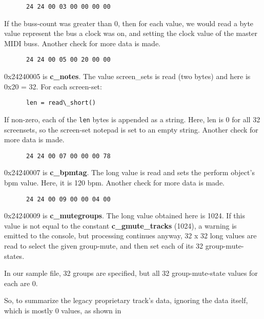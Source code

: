    \begin{verbatim}
      24 24 00 03 00 00 00 00
   \end{verbatim}

   If the buss-count was greater than 0, then for each value, we would read a
   byte value represent the bus a clock was on, and setting the clock value
   of the master MIDI buss.
   Another check for more data is made.

   \begin{verbatim}
      24 24 00 05 00 20 00 00
   \end{verbatim}

   0x24240005 is \textbf{c\_notes}.  The value screen\_sets is read (two
   bytes) and
   here is 0x20 = 32.  For each screen-set:

   \begin{verbatim}
      len = read\_short()
   \end{verbatim}

   If non-zero, each of the \texttt{len} bytes is appended as a string.
   Here, len is 0 for all 32 screensets, so the screen-set notepad is set to
   an empty string.
   Another check for more data is made.

   \begin{verbatim}
      24 24 00 07 00 00 00 78
   \end{verbatim}

   0x24240007 is \textbf{c\_bpmtag}.  The long value is read and sets the
   perform object's bpm value.  Here, it is 120 bpm.
   Another check for more data is made.

   \begin{verbatim}
      24 24 00 09 00 00 04 00
   \end{verbatim}

   0x24240009 is \textbf{c\_mutegroups}.  The long value obtained here is
   1024.  If this value is not equal to the constant
   \textbf{c\_gmute\_tracks} (1024), a warning is emitted to the console,
   but processing continues anyway, 32 x 32 long values are read to select
   the given group-mute, and then set each of its 32 group-mute-states.

   In our sample file, 32 groups are specified, but all 32 group-mute-state
   values for each are 0.

   So, to summarize the legacy proprietary track's data, ignoring the data
   itself, which is mostly 0 values, as shown in

